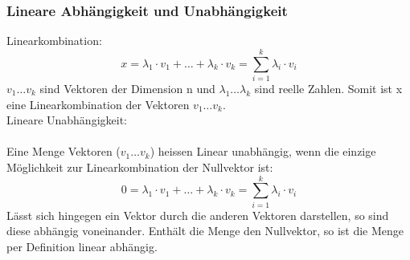 \documentclass[10pt]{scrartcl}
\begin{document}
\begin{multicols}{2}
\subsubsection*{Lineare Abhängigkeit und Unabhängigkeit}
Linearkombination:
\begin{equation}
x = \lambda_1 \cdot v_1 + \dots + \lambda_k \cdot v_k = \sum_{i=1}^k \lambda_i \cdot v_i
\end{equation}
$v_1 \dots v_k$ sind Vektoren der Dimension n und $\lambda_1 \dots \lambda_k$ sind reelle Zahlen. Somit ist x eine Linearkombination der Vektoren $v_1 \dots v_k$.\\
Lineare Unabhängigkeit:\\ \\
Eine Menge Vektoren ($v_1 \dots v_k$) heissen Linear unabhängig, wenn die einzige Möglichkeit zur Linearkombination der Nullvektor ist:
\begin{equation}
0 = \lambda_1 \cdot v_1 + \dots + \lambda_k \cdot v_k = \sum_{i=1}^k \lambda_i \cdot v_i
\end{equation}
Lässt sich hingegen ein Vektor durch die anderen Vektoren darstellen, so sind diese abhängig voneinander. Enthält die Menge den Nullvektor, so ist die Menge per Definition linear abhängig.

\end{multicols}
\end{document}
